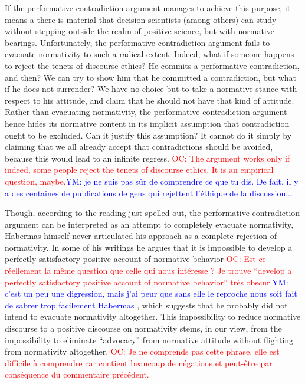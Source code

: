 \documentclass[preprint, french, english, 11pt]{elsarticle}%
\newcommand{\commentYM}[1]{\textcolor{blue}{YM: #1}}
\newcommand{\commentOC}[1]{\textcolor{red}{OC: #1}}
\begin{document}
If the performative contradiction argument manages to achieve this purpose, it means a there is material that decision scientists (among others) can study without stepping outside the realm of positive science, but with normative bearings. Unfortunately, the performative contradiction argument fails to evacuate normativity to such a radical extent. Indeed, what if someone happens to reject the tenets of discourse ethics? He commits a performative contradiction, and then? We can try to show him that he committed a contradiction, but what if he does not surrender? We have no choice but to take a normative stance with respect to his attitude, and claim that he should not have that kind of attitude. Rather than evacuating normativity, the performative contradiction argument hence hides its normative content in its implicit assumption that contradiction ought to be excluded. Can it justify this assumption? It cannot do it simply by claiming that we all already accept that contradictions should be avoided, because this would lead to an infinite regress.
\commentOC{The argument works only if indeed, some people reject the tenets of discourse ethics. It is an empirical question, maybe.}\commentYM{je ne suis pas sûr de comprendre ce que tu dis. De fait, il y a des centaines de publications de gens qui rejettent l'éthique de la discussion...}

Though, according to the reading just spelled out, the performative contradiction argument can be interpreted as an attempt to completely evacuate normativity, Habermas himself never articulated his approach as a complete rejection of normativity. In some of his writings he argues that it is impossible to develop a perfectly satisfactory positive account of normative behavior
\commentOC{Est-ce réellement la même question que celle qui nous intéresse ? Je trouve “develop a perfectly satisfactory positive account of normative behavior” très obscur.}\commentYM{c'est un peu une digression, mais j'ai peur que sans elle le reproche nous soit fait de sabrer trop facilement Habermas}%
, which suggests that he probably did not intend to evacuate normativity altogether. This impossibility to reduce normative discourse to a positive discourse on normativity stems, in our view, from the impossibility to eliminate ``advocacy'' from normative attitude without flighting from normativity altogether. 
\commentOC{Je ne comprends pas cette phrase, elle est difficile à comprendre car contient beaucoup de négations et peut-être par conséquence du commentaire précédent.} 
\end{document}
